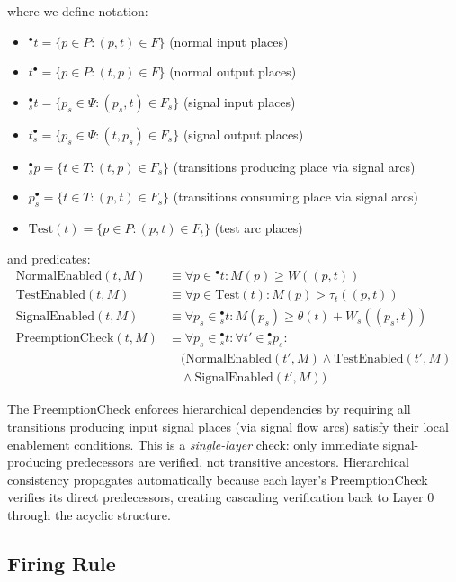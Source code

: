 \documentclass[10pt,letterpaper]{article}
\begin{document}
where we define notation:
\begin{itemize}
\item ${}^\bullet t = \{p \in P : (p,t) \in F\}$ (normal input places)
\item $t^\bullet = \{p \in P : (t,p) \in F\}$ (normal output places)
\item ${}^\bullet_s t = \{p_s \in \Psi : (p_s,t) \in F_s\}$ (signal input places)
\item $t^\bullet_s = \{p_s \in \Psi : (t,p_s) \in F_s\}$ (signal output places)
\item ${}^\bullet_s p = \{t \in T : (t,p) \in F_s\}$ (transitions producing place via signal arcs)
\item $p^\bullet_s = \{t \in T : (p,t) \in F_s\}$ (transitions consuming place via signal arcs)
\item $\text{Test}(t) = \{p \in P : (p,t) \in F_t\}$ (test arc places)
\end{itemize}

and predicates:
\begin{align}
\text{NormalEnabled}(t,M) &\equiv \forall p \in {}^\bullet t: M(p) \geq W((p,t)) \\
\text{TestEnabled}(t,M) &\equiv \forall p \in \text{Test}(t): M(p) > \tau_t((p,t)) \\
\text{SignalEnabled}(t,M) &\equiv \forall p_s \in {}^\bullet_s t: M(p_s) \geq \theta(t) + W_s((p_s,t)) \\
\text{PreemptionCheck}(t,M) &\equiv \forall p_s \in {}^\bullet_s t: \forall t' \in {}^{\bullet}_s p_s: \nonumber \\
&\quad (\text{NormalEnabled}(t',M) \wedge \text{TestEnabled}(t',M) \nonumber \\
&\quad \wedge \text{SignalEnabled}(t',M))
\end{align}

The PreemptionCheck enforces hierarchical dependencies by requiring all transitions producing input signal places (via signal flow arcs) satisfy their local enablement conditions. This is a \textit{single-layer} check: only immediate signal-producing predecessors are verified, not transitive ancestors. Hierarchical consistency propagates automatically because each layer's PreemptionCheck verifies its direct predecessors, creating cascading verification back to Layer 0 through the acyclic structure.

\subsection{Firing Rule}
\end{document}
